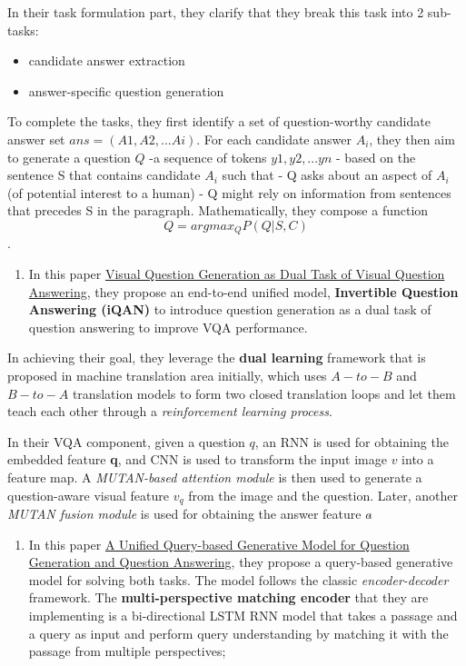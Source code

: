 \documentclass{acm_proc_article-sp}
\providecommand{\tightlist}{%
  \setlength{\itemsep}{0pt}\setlength{\parskip}{0pt}}
\begin{document}
In their task formulation part, they clarify that they break this task
into 2 sub-tasks:

\begin{itemize}
\tightlist
\item
  candidate answer extraction
\item
  answer-specific question generation
\end{itemize}

To complete the tasks, they first identify a set of question-worthy
candidate answer set \(ans = (A1, A2,...Ai)\). For each candidate answer
\(A_i\), they then aim to generate a question \(Q\) -a sequence of
tokens \({y1,y2,...yn}\) - based on the sentence S that contains
candidate \(A_i\) such that - Q asks about an aspect of \(A_i\) (of
potential interest to a human) - Q might rely on information from
sentences that precedes S in the paragraph. Mathematically, they compose
a function \[Q = argmax_Q P(Q|S,C)\].

\begin{enumerate}
\def\labelenumi{\arabic{enumi}.}
\setcounter{enumi}{2}
\tightlist
\item
  In this paper
  \href{http://cvboy.com/pdf/publications/cvpr2018_iqan.pdf}{Visual
  Question Generation as Dual Task of Visual Question Answering}, they
  propose an end-to-end unified model, \textbf{Invertible Question
  Answering (iQAN)} to introduce question generation as a dual task of
  question answering to improve VQA performance.
\end{enumerate}

In achieving their goal, they leverage the \textbf{dual learning}
framework that is proposed in machine translation area initially, which
uses \(A-to-B\) and \(B-to-A\) translation models to form two closed
translation loops and let them teach each other through a
\emph{reinforcement learning process}.

In their VQA component, given a question \(q\), an RNN is used for
obtaining the embedded feature \textbf{q}, and CNN is used to transform
the input image \(v\) into a feature map. A \emph{MUTAN-based attention
module} is then used to generate a question-aware visual feature \(v_q\)
from the image and the question. Later, another \emph{MUTAN fusion
module} is used for obtaining the answer feature \(a\hat{}\)

\begin{enumerate}
\def\labelenumi{\arabic{enumi}.}
\setcounter{enumi}{3}
\tightlist
\item
  In this paper \href{https://arxiv.org/pdf/1709.01058.pdf}{A Unified
  Query-based Generative Model for Question Generation and Question
  Answering}, they propose a query-based generative model for solving
  both tasks. The model follows the classic \emph{encoder-decoder}
  framework. The \textbf{multi-perspective matching encoder} that they
  are implementing is a bi-directional LSTM RNN model that takes a
  passage and a query as input and perform query understanding by
  matching it with the passage from multiple perspectives;
\end{enumerate}
\end{document}
